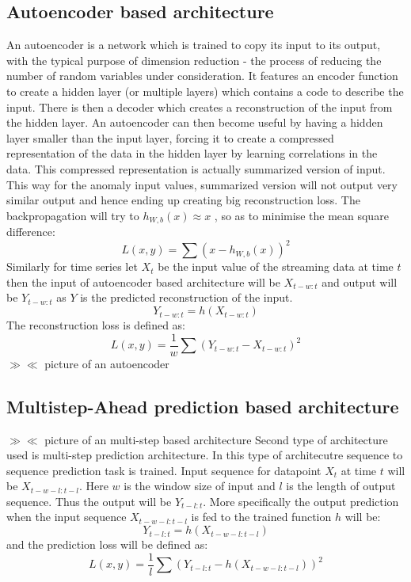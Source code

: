 \documentclass[12pt]{article}
\begin{document}
\subsection{Autoencoder based architecture}
An autoencoder is a network which is trained to copy its input to its output, with the typical purpose of dimension reduction - the process of reducing the number of random variables under consideration. It features an encoder function to create a hidden layer (or multiple layers) which contains a code to describe the input. There is then a decoder which creates a reconstruction of the input from the hidden layer. An autoencoder can then become useful by having a hidden layer smaller than the input layer, forcing it to create a compressed representation of the data in the hidden layer by learning correlations in the data. This compressed representation is actually summarized version of input. This way for the anomaly input values, summarized version will not output very similar output and hence ending up creating big reconstruction loss.
The backpropagation will try to  $h_{W,b}(x) \approx x$ , so as to minimise the mean square difference:
\begin{equation}
L(x,y) = \sum(x-h_{W,b}(x))^2
\end{equation}
Similarly for time series let $X_t$ be the input value of the streaming data at time $t$ then the input of autoencoder based architecture will be $X_{t-w:t}$ and output will be $Y_{t-w:t}$ as $Y$ is the predicted reconstruction of the input. 
\begin{equation}
Y_{t-w:t} = h(X_{t-w:t})
\end{equation}
The reconstruction loss is defined as:
\begin{equation}
L(x,y) = \frac{1}{w}\sum(Y_{t-w:t}-X_{t-w:t})^2
\end{equation}
$\gg \ll$ picture of an autoencoder
\subsection{Multistep-Ahead prediction based architecture}
$\gg \ll$ picture of an multi-step based architecture
Second type of architecture used is multi-step prediction architecture. In this type of architecutre sequence to sequence prediction task is trained. Input sequence for datapoint $X_t$ at time $t$ will be $X_{t-w-l:t-l}$. Here $w$ is the window size of input and $l$ is the length of output sequence. Thus the output will be $Y_{t-l:t}$.  
More specifically the output prediction when the input sequence $X_{t-w-l:t-l}$ is fed to the trained function $h$ will be:
\begin{equation}
Y_{t-l:t} = h(X_{t-w-l:t-l})
\end{equation}
and the prediction loss will be defined as:
\begin{equation}
L(x,y) = \frac{1}{l}\sum(Y_{t-l:t}-h(X_{t-w-l:t-l}))^2
\end{equation}
\end{document}

